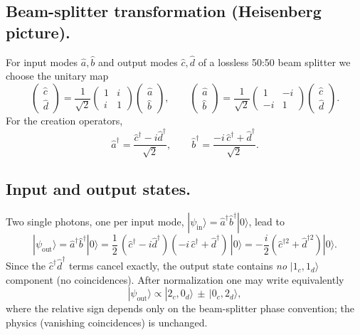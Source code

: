 \subsection*{Beam-splitter transformation (Heisenberg picture).}
For input modes \(\hat a,\hat b\) and output modes \(\hat c,\hat d\) of a lossless 50:50 beam splitter we choose the unitary map
\[
\begin{pmatrix}
	\hat c \\ \hat d
\end{pmatrix}
= \frac{1}{\sqrt{2}}
\begin{pmatrix}
	1 & i \\
	i & 1
\end{pmatrix}
\begin{pmatrix}
	\hat a \\ \hat b
\end{pmatrix},
\qquad
\begin{pmatrix}
	\hat a \\ \hat b
\end{pmatrix}
= \frac{1}{\sqrt{2}}
\begin{pmatrix}
	1 & -i \\
	-i & 1
\end{pmatrix}
\begin{pmatrix}
	\hat c \\ \hat d
\end{pmatrix}.
\]
For the creation operators,
\[
\hat a^\dagger=\frac{\hat c^\dagger - i \hat d^\dagger}{\sqrt{2}},
\qquad
\hat b^\dagger=\frac{-i\,\hat c^\dagger + \hat d^\dagger}{\sqrt{2}}.
\]

\subsection*{Input and output states.}
Two single photons, one per input mode,
\(|\psi_{\text{in}}\rangle=\hat a^\dagger \hat b^\dagger |0\rangle\),
lead to
\[
|\psi_{\text{out}}\rangle
= \hat a^\dagger \hat b^\dagger |0\rangle
= \frac{1}{2}\,(\hat c^\dagger - i \hat d^\dagger)(-i\,\hat c^\dagger + \hat d^\dagger)\,|0\rangle
= -\frac{i}{2}\!\left(\hat c^{\dagger 2}+\hat d^{\dagger 2}\right)|0\rangle.
\]
Since the \(\hat c^\dagger \hat d^\dagger\) terms cancel exactly, the output state contains \emph{no} \(|1_c,1_d\rangle\) component (no coincidences). After normalization one may write equivalently
\[
|\psi_{\text{out}}\rangle
\propto |2_c,0_d\rangle \,\pm\, |0_c,2_d\rangle,
\]
where the relative sign depends only on the beam-splitter phase convention; the physics (vanishing coincidences) is unchanged.

